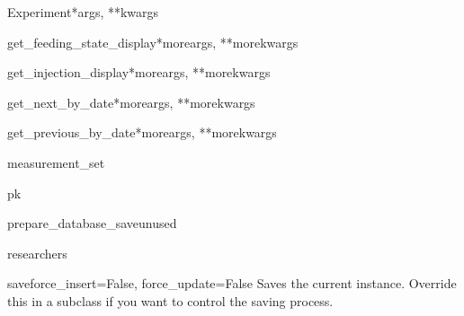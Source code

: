 \documentclass[letterpaper,10pt,english]{sphinxmanual}
\begin{document}
\begin{classdesc}{Experiment}{*args, **kwargs}
\hypertarget{data.models.Experiment.get_feeding_state_display}{}\begin{methoddesc}[Experiment]{get\_feeding\_state\_display}{*moreargs, **morekwargs}\end{methoddesc}

\hypertarget{data.models.Experiment.get_injection_display}{}\begin{methoddesc}[Experiment]{get\_injection\_display}{*moreargs, **morekwargs}\end{methoddesc}

\hypertarget{data.models.Experiment.get_next_by_date}{}\begin{methoddesc}[Experiment]{get\_next\_by\_date}{*moreargs, **morekwargs}\end{methoddesc}

\hypertarget{data.models.Experiment.get_previous_by_date}{}\begin{methoddesc}[Experiment]{get\_previous\_by\_date}{*moreargs, **morekwargs}\end{methoddesc}

\hypertarget{data.models.Experiment.measurement_set}{}\begin{memberdesc}[Experiment]{measurement\_set}\end{memberdesc}

\hypertarget{data.models.Experiment.pk}{}\begin{memberdesc}[Experiment]{pk}\end{memberdesc}

\hypertarget{data.models.Experiment.prepare_database_save}{}\begin{methoddesc}[Experiment]{prepare\_database\_save}{unused}\end{methoddesc}

\hypertarget{data.models.Experiment.researchers}{}\begin{memberdesc}[Experiment]{researchers}\end{memberdesc}

\hypertarget{data.models.Experiment.save}{}\begin{methoddesc}[Experiment]{save}{force\_insert=False, force\_update=False}
Saves the current instance. Override this in a subclass if you want to
control the saving process.


\end{methoddesc}
\end{classdesc}
\end{document}
